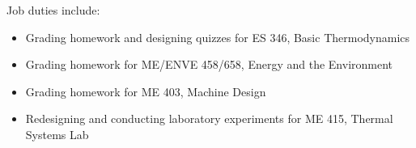 \normalsize
Job duties include:
\small
\begin{itemize}
    \item Grading homework and designing quizzes for ES 346, Basic Thermodynamics
    \item Grading homework for ME/ENVE 458/658, Energy and the Environment
    \item Grading homework for ME 403, Machine Design
    \item Redesigning and conducting laboratory experiments for ME 415, Thermal Systems Lab
\end{itemize}
\normalsize
\medskip
